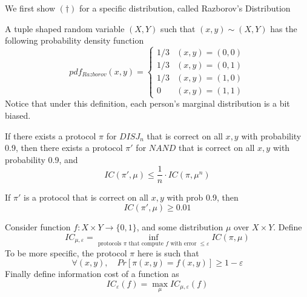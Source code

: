 We first show $(\dagger)$ for a specific distribution, called Razborov's Distribution
\begin{definition}
	A tuple shaped random variable $(X, Y)$ such that $(x, y) \sim (X, Y)$ has the following probability density function
	\begin{equation}
		pdf_{Razborov}(x, y) = \begin{cases}
			1/3 & (x, y) = (0, 0) \\
			1/3 & (x, y) = (0, 1) \\
			1/3 & (x, y) = (1, 0) \\
			0 & (x, y) = (1, 1)
		\end{cases}	
	\end{equation}
	Notice that under this definition, each person's marginal distribution is a bit biased. 
\end{definition}

\begin{theorem}
	If there exists a protocol $\pi$ for $DISJ_n$ that is correct on all $x, y$ with probability 0.9, then there exists a protocol $\pi'$ for $NAND$ that is correct on all $x, y$ with probability 0.9, and 
	\begin{equation}
		IC(\pi', \mu) \leq \frac{1}{n} \cdot IC(\pi, \mu^n)
	\end{equation}
\end{theorem}

\begin{theorem}
	[Piece 2]
	If $\pi'$ is a protocol that is correct on all $x, y$ with prob 0.9, then 
	\begin{equation}
		IC(\pi', \mu) \geq 0.01 
	\end{equation}
\end{theorem}

\begin{definition}
	Consider function $f: X \times Y \rightarrow \{0, 1\}$, and some distribution $\mu$ over $X \times Y$. Define 
	\begin{equation}
		IC_{\mu, \varepsilon} = \inf _{\text{protocols $\pi$ that compute $f$ with error $\leq \varepsilon$}} IC(\pi, \mu)
	\end{equation}
	To be more specific, the protocol $\pi$ here is such that
	\begin{equation}
		\forall (x, y), \quad Pr[\pi(x, y) = f(x, y) ] \geq 1 - \varepsilon
	\end{equation}
	Finally define information cost of a function as 
	\begin{equation}
		IC_{\varepsilon} (f) = \max_\mu IC_{\mu, \varepsilon} (f)
	\end{equation}
\end{definition}

